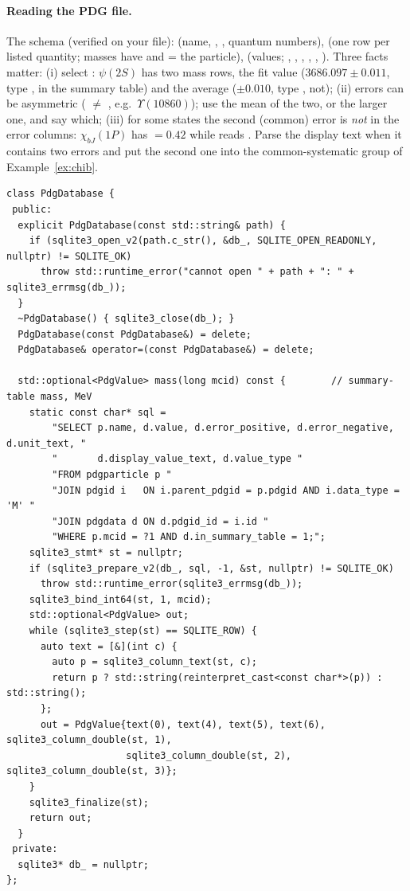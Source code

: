 \documentclass[11pt,a4paper]{article}
\numberwithin{equation}{section}
\theoremstyle{definition}
\theoremstyle{plain}
\theoremstyle{remark}
\numberwithin{algorithm}{section}
\begin{document}
\paragraph{Reading the PDG file.}\label{sec:bp-data} The schema (verified on your file):  (name, , , quantum numbers),  (one row per listed quantity; masses have  and  = the particle),  (values; , , , , , ). Three facts matter:
(i) select : $\psi(2S)$ has two mass rows, the fit value ($3686.097\pm0.011$, type , in the summary table) and the average ($\pm0.010$, type , not);
(ii) errors can be asymmetric ( $\ne$ , e.g.\ $\Upsilon(10860)$); use the mean of the two, or the larger one, and say which;
(iii) for some states the second (common) error is \emph{not} in the error columns: $\chi_{bJ}(1P)$ has  $=0.42$ while  reads . Parse the display text when it contains two errors and put the second one into the common-systematic group of Example~\ref{ex:chib}.
\begin{lstlisting}[style=cpp]
class PdgDatabase {
 public:
  explicit PdgDatabase(const std::string& path) {
    if (sqlite3_open_v2(path.c_str(), &db_, SQLITE_OPEN_READONLY, nullptr) != SQLITE_OK)
      throw std::runtime_error("cannot open " + path + ": " + sqlite3_errmsg(db_));
  }
  ~PdgDatabase() { sqlite3_close(db_); }
  PdgDatabase(const PdgDatabase&) = delete;
  PdgDatabase& operator=(const PdgDatabase&) = delete;

  std::optional<PdgValue> mass(long mcid) const {        // summary-table mass, MeV
    static const char* sql =
        "SELECT p.name, d.value, d.error_positive, d.error_negative, d.unit_text, "
        "       d.display_value_text, d.value_type "
        "FROM pdgparticle p "
        "JOIN pdgid i   ON i.parent_pdgid = p.pdgid AND i.data_type = 'M' "
        "JOIN pdgdata d ON d.pdgid_id = i.id "
        "WHERE p.mcid = ?1 AND d.in_summary_table = 1;";
    sqlite3_stmt* st = nullptr;
    if (sqlite3_prepare_v2(db_, sql, -1, &st, nullptr) != SQLITE_OK)
      throw std::runtime_error(sqlite3_errmsg(db_));
    sqlite3_bind_int64(st, 1, mcid);
    std::optional<PdgValue> out;
    while (sqlite3_step(st) == SQLITE_ROW) {
      auto text = [&](int c) {
        auto p = sqlite3_column_text(st, c);
        return p ? std::string(reinterpret_cast<const char*>(p)) : std::string();
      };
      out = PdgValue{text(0), text(4), text(5), text(6), sqlite3_column_double(st, 1),
                     sqlite3_column_double(st, 2), sqlite3_column_double(st, 3)};
    }
    sqlite3_finalize(st);
    return out;
  }
 private:
  sqlite3* db_ = nullptr;
};
\end{lstlisting}
\end{document}
